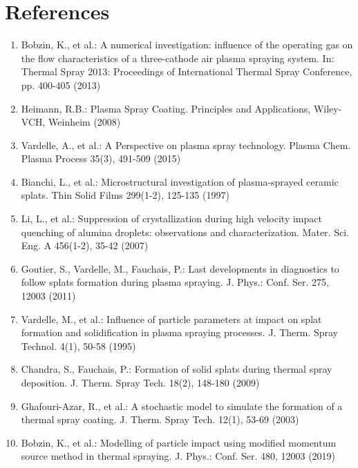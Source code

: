 \documentclass[10pt]{article}
\begin{document}
\section*{References}
\begin{enumerate}
  \item Bobzin, K., et al.: A numerical investigation: influence of the operating gas on the flow characteristics of a three-cathode air plasma spraying system. In: Thermal Spray 2013: Proceedings of International Thermal Spray Conference, pp. 400-405 (2013)

  \item Heimann, R.B.: Plasma Spray Coating. Principles and Applications, Wiley-VCH, Weinheim (2008)

  \item Vardelle, A., et al.: A Perspective on plasma spray technology. Plasma Chem. Plasma Process 35(3), 491-509 (2015)

  \item Bianchi, L., et al.: Microstructural investigation of plasma-sprayed ceramic splats. Thin Solid Films 299(1-2), 125-135 (1997)

  \item Li, L., et al.: Suppression of crystallization during high velocity impact quenching of alumina droplets: observations and characterization. Mater. Sci. Eng. A 456(1-2), 35-42 (2007)

  \item Goutier, S., Vardelle, M., Fauchais, P.: Last developments in diagnostics to follow splats formation during plasma spraying. J. Phys.: Conf. Ser. 275, 12003 (2011)

  \item Vardelle, M., et al.: Influence of particle parameters at impact on splat formation and solidification in plasma spraying processes. J. Therm. Spray Technol. 4(1), 50-58 (1995)

  \item Chandra, S., Fauchais, P.: Formation of solid splats during thermal spray deposition. J. Therm. Spray Tech. 18(2), 148-180 (2009)

  \item Ghafouri-Azar, R., et al.: A stochastic model to simulate the formation of a thermal spray coating. J. Therm. Spray Tech. 12(1), 53-69 (2003)

  \item Bobzin, K., et al.: Modelling of particle impact using modified momentum source method in thermal spraying. J. Phys.: Conf. Ser. 480, 12003 (2019)


\end{enumerate}
\end{document}
